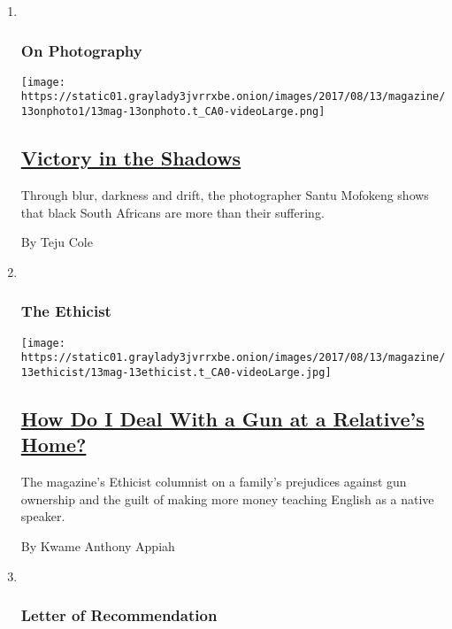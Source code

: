 \begin{enumerate}
\def\labelenumi{\arabic{enumi}.}
\item ~
  \hypertarget{on-photography}{%
  \subsubsection{On Photography}\label{on-photography}}

  \texttt{[image: https://static01.graylady3jvrrxbe.onion/images/2017/08/13/magazine/13onphoto1/13mag-13onphoto.t\_CA0-videoLarge.png]}

  \hypertarget{victory-in-the-shadows}{%
  \subsection{\texorpdfstring{\href{/2017/08/10/magazine/victory-in-the-shadows.html}{Victory
  in the
  Shadows}}{Victory in the Shadows}}\label{victory-in-the-shadows}}

  Through blur, darkness and drift, the photographer Santu Mofokeng
  shows that black South Africans are more than their suffering.

  By Teju Cole
\item ~
  \hypertarget{the-ethicist}{%
  \subsubsection{The Ethicist}\label{the-ethicist}}

  \texttt{[image: https://static01.graylady3jvrrxbe.onion/images/2017/08/13/magazine/13ethicist/13mag-13ethicist.t\_CA0-videoLarge.jpg]}

  \hypertarget{how-do-i-deal-with-a-gun-at-a-relatives-home}{%
  \subsection{\texorpdfstring{\href{/2017/08/09/magazine/how-do-i-deal-with-a-gun-at-a-relatives-home.html}{How
  Do I Deal With a Gun at a Relative's
  Home?}}{How Do I Deal With a Gun at a Relative's Home?}}\label{how-do-i-deal-with-a-gun-at-a-relatives-home}}

  The magazine's Ethicist columnist on a family's prejudices against gun
  ownership and the guilt of making more money teaching English as a
  native speaker.

  By Kwame Anthony Appiah
\item ~
  \hypertarget{letter-of-recommendation}{%
  \subsubsection{Letter of
  Recommendation}\label{letter-of-recommendation}}


\end{enumerate}
